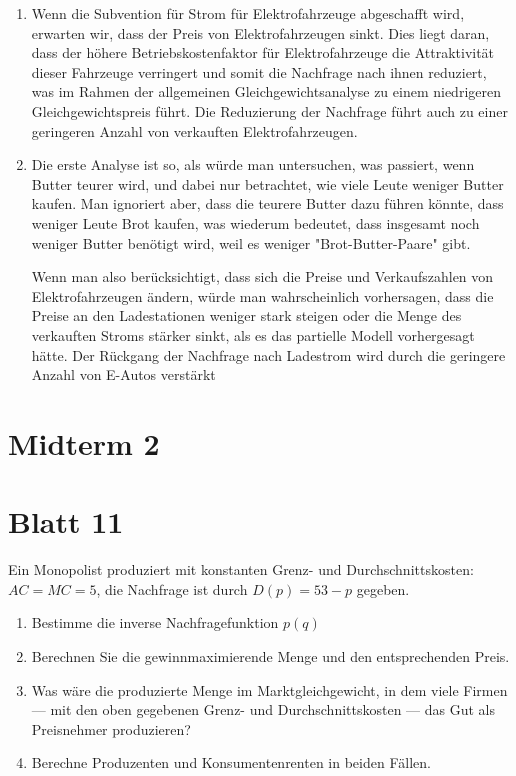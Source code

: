 \begin{solution}
	\begin{enumerate}
		\item Wenn die Subvention für Strom für Elektrofahrzeuge abgeschafft wird, erwarten wir, dass der Preis von Elektrofahrzeugen sinkt. Dies liegt daran, dass der höhere Betriebskostenfaktor für Elektrofahrzeuge die Attraktivität dieser Fahrzeuge verringert und somit die Nachfrage nach ihnen reduziert, was im Rahmen der allgemeinen Gleichgewichtsanalyse zu einem niedrigeren Gleichgewichtspreis führt. Die Reduzierung der Nachfrage führt auch zu einer geringeren Anzahl von verkauften Elektrofahrzeugen.
		\item Die erste Analyse ist so, als würde man untersuchen, was passiert, wenn Butter teurer wird, und dabei nur betrachtet, wie viele Leute weniger Butter kaufen. Man ignoriert aber, dass die teurere Butter dazu führen könnte, dass weniger Leute Brot kaufen, was wiederum bedeutet, dass insgesamt noch weniger Butter benötigt wird, weil es weniger "Brot-Butter-Paare" gibt.

		      Wenn man also berücksichtigt, dass sich die Preise und Verkaufszahlen von Elektrofahrzeugen ändern, würde man wahrscheinlich vorhersagen, dass die Preise an den Ladestationen weniger stark steigen oder die Menge des verkauften Stroms stärker sinkt, als es das partielle Modell vorhergesagt hätte. Der Rückgang der Nachfrage nach Ladestrom wird durch die geringere Anzahl von E-Autos verstärkt
	\end{enumerate}

\end{solution}

\section{Midterm 2}

\section{Blatt 11}

\begin{question}
    Ein Monopolist produziert mit konstanten Grenz- und Durchschnittskosten: $AC = MC =5$, die Nachfrage ist durch $D(p) = 53 -p$ gegeben. 
    \begin{enumerate}
        \item Bestimme die inverse Nachfragefunktion $p(q)$ 
        \item Berechnen Sie die gewinnmaximierende Menge und den entsprechenden Preis.
        \item Was wäre die produzierte Menge im Marktgleichgewicht, in dem viele Firmen — mit den oben
gegebenen Grenz- und Durchschnittskosten — das Gut als Preisnehmer produzieren?
\item Berechne Produzenten und Konsumentenrenten in beiden Fällen. 
    \end{enumerate}
\end{question}

